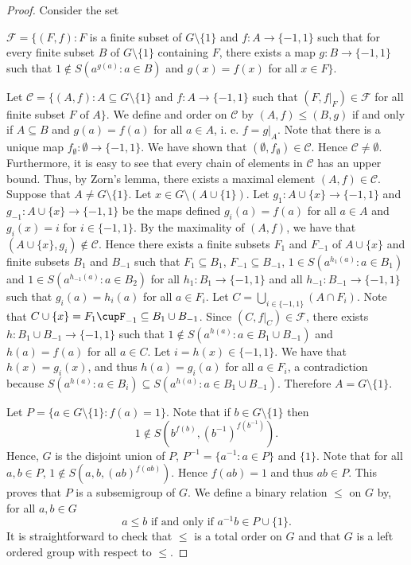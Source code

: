 \begin{proof}
	Consider the set 
	
	$\mathcal{F}=\{ (F,f) : F$ is a finite subset  of $G\setminus\{ 1\}$ and   $f\colon A\to\{ -1, 1\}$ such that for every finite subset $B$ of $G\setminus\{ 1\}$ containing $F$, there exists a map  $g\colon B\to \{ -1,1\}$ such that  $1\notin S(a^{g(a)} : a\in B)$ and $g(x)=f(x)$ for all $x\in F\}$. 
	
	Let $\mathcal{C}=\{ (A,f) : A\subseteq G\setminus\{ 1\}$ and $f\colon A\to \{ -1,1\}$ such that  $(F,f|_F)\in\mathcal{F}$ for all finite subset $F\text{ of }A \}$. We define and order on $\mathcal{C}$ by $(A,f)\leq (B,g)$ if and only if $A\subseteq B$ and $g(a)=f(a)$ for all $a\in A$, i. e. $f=g|_A$. Note that there is a unique map $f_{\emptyset}\colon \emptyset\to \{-1,1\}$. We have shown that $(\emptyset,f_{\emptyset})\in\mathcal{C}$. Hence $\mathcal{C}\neq \emptyset$. Furthermore, it is easy to see that every chain of elements in $\mathcal{C}$ has an upper bound. Thus, by Zorn's lemma, there exists a maximal element $(A,f)\in\mathcal{C}$. Suppose that $A\neq G\setminus\{ 1\}$. Let $x\in G\setminus (A\cup\{ 1\})$. Let $g_1\colon A\cup\{ x\}\to\{ -1,1\}$ and $g_{-1}\colon A\cup\{ x\}\to\{ -1,1\}$ be the maps defined $g_i(a)=f(a)$ for all $a\in A$ and $g_i(x)=i$ for $i\in\{ -1,1\}$. By the maximality of $(A,f)$, we have that $(A\cup\{ x\}, g_i)\notin\mathcal{C}$. Hence there exists a finite subsets $F_1$ and $F_{-1}$ of $A\cup \{ x\}$ and finite subsets $B_1$ and $B_{-1}$ such that $F_1\subseteq B_1$, $F_{-1}\subseteq B_{-1}$, $1\in S(a^{h_1(a)}: a\in B_1)$ and $1\in S(a^{h_{-1}(a)}:a\in B_2)$ for all $h_1\colon B_1\to\{ -1,1\}$ and all $h_{-1}\colon B_{-1}\to \{ -1,1\}$ such that $g_i(a)=h_i(a)$ for all $a\in F_i$. Let $C=\bigcup_{i\in\{ -1,1\}}(A\cap F_i)$. Note that $C\cup\{ x\}=F_1\cupF_{-1}\subseteq B_1\cup B_{-1}$. Since $(C,f|_{C})\in \mathcal{F}$, there exists $h\colon B_1\cup B_{-1}\to\{ -1,1\}$ such that $1\notin S(a^{h(a)}: a\in B_1\cup B_{-1})$ and $h(a)=f(a)$ for all $a\in C$. Let $i=h(x)\in\{ -1,1\}$. We have that $h(x)=g_i(x)$, and thus $h(a)=g_i(a)$ for all $a\in F_i$, a contradiction because $S(a^{h(a)}:a\in B_i)\subseteq S(a^{h(a)}: a\in B_1\cup B_{-1})$.
	Therefore $A=G\setminus\{ 1\}$. 
	
	Let $P=\{a\in G\setminus \{1\} : f(a)=1\}$. Note that if $b\in G\setminus\{ 1\}$ then 
	\[1\notin S(b^{f(b)},(b^{-1})^{f(b^{-1})}).\] 
	Hence, $G$ is the disjoint union of $P$, $P^{-1}=\{ a^{-1} : a\in P\}$ and $\{ 1\}$. Note that for all $a,b\in P$, $1\notin S(a,b,(ab)^{f(ab)})$. Hence $f(ab)=1$ and thus $ab\in P$. This proves that $P$ is a subsemigroup of $G$. We define a binary relation $\leq$ on $G$ by, for all $a,b\in G$
	\[ a\leq b\text{ if and only if }a^{-1}b\in P\cup\{ 1\}.\]
	It is straightforward to check that $\leq$ is a total order on $G$ and that $G$ is a left ordered group with respect to $\leq$.
\end{proof}

